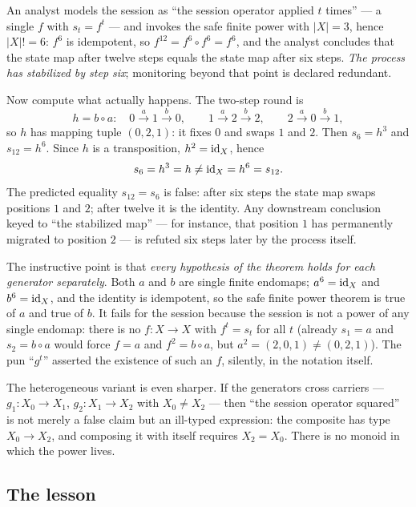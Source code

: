 An analyst models the session as ``the session operator applied $t$ times''
--- a single $f$ with $s_t = f^t$ --- and invokes the safe finite power with
$|X| = 3$, hence $|X|! = 6$: $f^6$ is idempotent, so
$f^{12} = f^6 \circ f^6 = f^6$, and the analyst concludes that the state map
after twelve steps equals the state map after six steps. \emph{The process
has stabilized by step six}; monitoring beyond that point is declared
redundant.

Now compute what actually happens. The two-step round is
\[
h = b \circ a : \quad
0 \xrightarrow{\;a\;} 1 \xrightarrow{\;b\;} 0, \qquad
1 \xrightarrow{\;a\;} 2 \xrightarrow{\;b\;} 2, \qquad
2 \xrightarrow{\;a\;} 0 \xrightarrow{\;b\;} 1,
\]
so $h$ has mapping tuple $(0, 2, 1)$: it fixes $0$ and swaps $1$ and $2$.
Then $s_6 = h^3$ and $s_{12} = h^6$. Since $h$ is a transposition,
$h^2 = \mathrm{id}_X$, hence
\[
s_6 = h^3 = h \neq \mathrm{id}_X = h^6 = s_{12}.
\]
The predicted equality $s_{12} = s_6$ is false: after six steps the state
map swaps positions $1$ and $2$; after twelve it is the identity. Any
downstream conclusion keyed to ``the stabilized map'' --- for instance, that
position $1$ has permanently migrated to position $2$ --- is refuted six
steps later by the process itself.

The instructive point is that \emph{every hypothesis of the theorem holds for
each generator separately}. Both $a$ and $b$ are single finite endomaps;
$a^6 = \mathrm{id}_X$ and $b^6 = \mathrm{id}_X$, and the identity is idempotent, so the safe
finite power theorem is true of $a$ and true of $b$. It fails for the session
because the session is not a power of any single endomap: there is no
$f : X \to X$ with $f^t = s_t$ for all $t$ (already $s_1 = a$ and
$s_2 = b \circ a$ would force $f = a$ and $f^2 = b\circ a$, but
$a^2 = (2,0,1) \neq (0,2,1)$). The pun ``$g^t$'' asserted the existence of
such an $f$, silently, in the notation itself.

The heterogeneous variant is even sharper. If the generators cross carriers
--- $g_1 : X_0 \to X_1$, $g_2 : X_1 \to X_2$ with $X_0 \neq X_2$ --- then
``the session operator squared'' is not merely a false claim but an ill-typed
expression: the composite has type $X_0 \to X_2$, and composing it with
itself requires $X_2 = X_0$. There is no monoid in which the power lives.

\subsection{The lesson}


